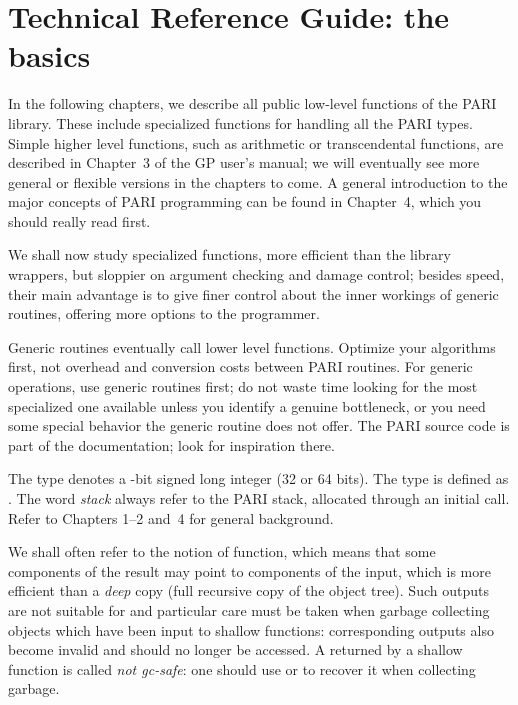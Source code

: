 %
%
\chapter{Technical Reference Guide: the basics}

In the following chapters, we describe all public low-level functions of the
PARI library. These include specialized functions for handling all the PARI
types. Simple higher level functions, such as arithmetic or transcendental
functions, are described in Chapter~3 of the GP user's manual; we will
eventually see more general or flexible versions in the chapters to come. A
general introduction to the major concepts of PARI programming can be found
in Chapter~4, which you should really read first.

We shall now study specialized functions, more efficient than the library
wrappers, but sloppier on argument checking and damage control; besides
speed, their main advantage is to give finer control about the inner
workings of generic routines, offering more options to the programmer.

 Generic routines eventually call lower level
functions. Optimize your algorithms first, not overhead and conversion costs
between PARI routines. For generic operations, use generic routines first;
do not waste time looking for the most specialized one available unless you
identify a genuine bottleneck, or you need some special behavior the generic
routine does not offer. The PARI source code is part of the documentation;
look for inspiration there.\smallskip

The type  denotes a -bit signed long integer (32
or 64 bits). The type  is defined as . The word
\emph{stack} always refer to the PARI stack, allocated through an initial
 call. Refer to Chapters 1--2 and~4 for general background.

We shall often refer to the notion of  function, which means that
some components of the result may point to components of the input, which is
more efficient than a \emph{deep} copy (full recursive copy of the object
tree). Such outputs are not suitable for  and particular
care must be taken when garbage collecting objects which have been input to
shallow functions: corresponding outputs also become invalid and should no
longer be accessed. A  returned by a shallow function is
called \emph{not gc-safe}: one should use  or 
to recover it when collecting garbage.

